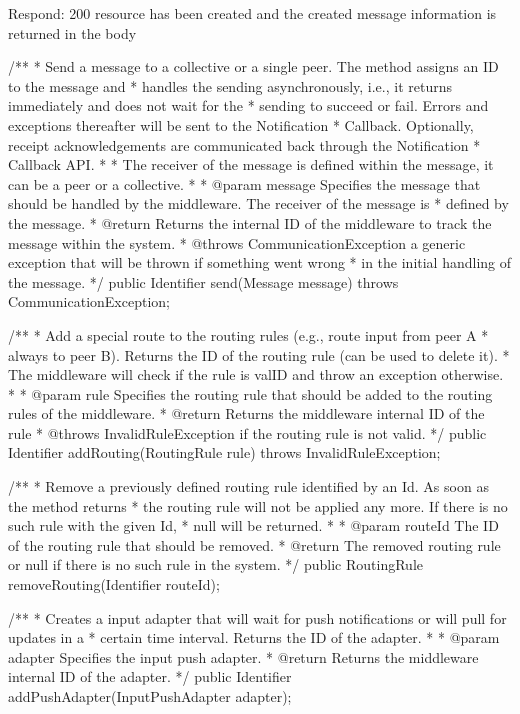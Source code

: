 Respond:
200 resource has been created and the created message information is returned in the body

/**
     * Send a message to a collective or a single peer. The method assigns an ID to the message and
     * handles the sending asynchronously, i.e., it returns immediately and does not wait for the
     * sending to succeed or fail. Errors and exceptions thereafter will be sent to the Notification
     * Callback. Optionally, receipt acknowledgements are communicated back through the Notification
     * Callback API.
     *
     * The receiver of the message is defined within the message, it can be a peer or a collective.
     *
     * @param message Specifies the message that should be handled by the middleware.  The receiver of the message is
     *                defined by the message.
     * @return Returns the internal ID of the middleware to track the message within the system.
     * @throws CommunicationException a generic exception that will be thrown if something went wrong
     *                                in the initial handling of the message.
     */
    public Identifier send(Message message) throws CommunicationException;

    /**
     * Add a special route to the routing rules (e.g., route input from peer A
     * always to peer B). Returns the ID of the routing rule (can be used to delete it).
     * The middleware will check if the rule is valID and throw an exception otherwise.
     *
     * @param rule Specifies the routing rule that should be added to the routing rules of the middleware.
     * @return Returns the middleware internal ID of the rule
     * @throws InvalidRuleException if the routing rule is not valid.
     */
    public Identifier addRouting(RoutingRule rule) throws InvalidRuleException;

    /**
     * Remove a previously defined routing rule identified by an Id. As soon as the method returns
     * the routing rule will not be applied any more. If there is no such rule with the given Id,
     * null will be returned.
     *
     * @param routeId The ID of the routing rule that should be removed.
     * @return The removed routing rule or null if there is no such rule in the system.
     */
    public RoutingRule removeRouting(Identifier routeId);

    /**
     * Creates a input adapter that will wait for push notifications or will pull for updates in a
     * certain time interval. Returns the ID of the adapter.
     *
     * @param adapter Specifies the input push adapter.
     * @return Returns the middleware internal ID of the adapter.
     */
    public Identifier addPushAdapter(InputPushAdapter adapter);

